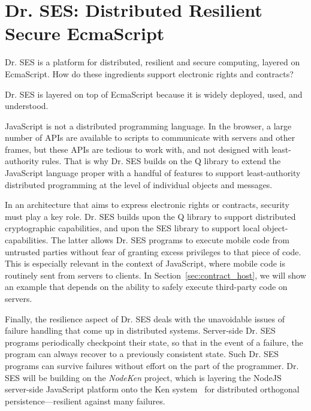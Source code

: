 \documentclass{llncs}
\begin{document}
\section{Dr. SES: Distributed Resilient Secure EcmaScript}

Dr. SES is a platform for distributed, resilient and secure computing, layered on EcmaScript. How do these ingredients support electronic rights and contracts?

Dr. SES is layered on top of EcmaScript because it is widely deployed, used, and understood.

JavaScript is not a distributed programming language. In the browser, a large number of APIs are available to scripts to communicate with servers and other frames, but these APIs are tedious to work with, and not designed with least-authority rules. That is why Dr. SES builds on the Q library to extend the JavaScript language proper with a handful of features to support least-authority distributed programming at the level of individual objects and messages.

In an architecture that aims to express electronic rights or contracts, security must play a key role. Dr. SES builds upon the Q library to support distributed cryptographic capabilities, and upon the SES library to support local object-capabilities. The latter allows Dr. SES programs to execute mobile code from untrusted parties without fear of granting excess privileges to that piece of code. This is especially relevant in the context of JavaScript, where mobile code is routinely sent from servers to clients. In Section~\ref{sec:contract_host}, we will show an example that  depends on the ability to safely execute third-party code on servers.

Finally, the resilience aspect of Dr. SES deals with the unavoidable issues of failure handling that come up in distributed systems. 
Server-side Dr. SES programs periodically checkpoint their state, so that in the event of a failure, the program can always recover to a previously consistent state. Such Dr. SES programs can survive failures without effort on the part of the programmer. Dr. SES will be building on the \emph{NodeKen} project, which is layering the NodeJS server-side JavaScript platform onto the Ken system~\cite{Yoo:CKen} for distributed orthogonal persistence---resilient against many failures.
\end{document}
